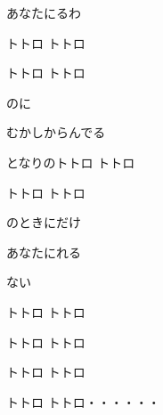 \documentclass[14pt]{extreport}
\begin{document}
{  あなたにるわ
  \trans{}

  トトロ トトロ
  \trans{}

  トトロ トトロ
  \trans{}

  のに
  \trans{}

  むかしからんでる
  \trans{}

  となりのトトロ トトロ
  \trans{}

  トトロ トトロ
  \trans{}

  のときにだけ
  \trans{}

  あなたにれる
  \trans{}

  ない
  \trans{}

  トトロ トトロ
  \trans{}

  トトロ トトロ
  \trans{}

  トトロ トトロ
  \trans{}

  トトロ トトロ・・・・・・
  \trans{}


}
\end{document}
